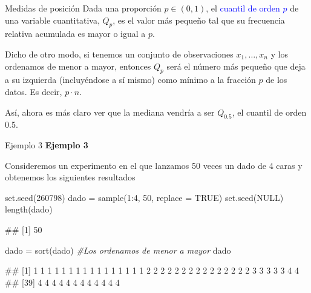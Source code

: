 \documentclass[
  ignorenonframetext,
  aspectratio=169]{beamer}
\newenvironment{Shaded}{\begin{snugshade}}{\end{snugshade}}
\newcommand{\AttributeTok}[1]{\textcolor[rgb]{0.77,0.63,0.00}{#1}}
\newcommand{\CommentTok}[1]{\textcolor[rgb]{0.56,0.35,0.01}{\textit{#1}}}
\newcommand{\ConstantTok}[1]{\textcolor[rgb]{0.00,0.00,0.00}{#1}}
\newcommand{\DecValTok}[1]{\textcolor[rgb]{0.00,0.00,0.81}{#1}}
\newcommand{\FunctionTok}[1]{\textcolor[rgb]{0.00,0.00,0.00}{#1}}
\newcommand{\NormalTok}[1]{#1}
\newcommand{\OtherTok}[1]{\textcolor[rgb]{0.56,0.35,0.01}{#1}}
\newcommand{\SpecialCharTok}[1]{\textcolor[rgb]{0.00,0.00,0.00}{#1}}
\let\oldverbatim\verbatim
\let\endoldverbatim\endverbatim
\renewenvironment{verbatim}{\tiny\oldverbatim}{\endoldverbatim}
\newcommand\blue[1]{\textcolor{blue}{#1}}
\begin{document}
\begin{frame}{Medidas de posición}
\protect\hypertarget{medidas-de-posiciuxf3n-2}{}
Dada una proporción \(p\in(0,1)\), el \blue{cuantil de orden $p$} de una
variable cuantitativa, \(Q_p\), es el valor más pequeño tal que su
frecuencia relativa acumulada es mayor o igual a \(p\).

Dicho de otro modo, si tenemos un conjunto de observaciones
\(x_1,\dots,x_n\) y los ordenamos de menor a mayor, entonces \(Q_p\)
será el número más pequeño que deja a su izquierda (incluyéndose a sí
mismo) como mínimo a la fracción \(p\) de los datos. Es decir,
\(p\cdot n\).

Así, ahora es más claro ver que la mediana vendría a ser \(Q_{0.5}\), el
cuantil de orden 0.5.
\end{frame}

\begin{frame}[fragile]{Ejemplo 3}
\protect\hypertarget{ejemplo-3-5}{}
\textbf{Ejemplo 3}

Consideremos un experimento en el que lanzamos 50 veces un dado de 4
caras y obtenemos los siguientes resultados

\begin{Shaded}
\begin{Highlighting}[]
\FunctionTok{set.seed}\NormalTok{(}\DecValTok{260798}\NormalTok{)}
\NormalTok{dado }\OtherTok{=} \FunctionTok{sample}\NormalTok{(}\DecValTok{1}\SpecialCharTok{:}\DecValTok{4}\NormalTok{, }\DecValTok{50}\NormalTok{, }\AttributeTok{replace =} \ConstantTok{TRUE}\NormalTok{)}
\FunctionTok{set.seed}\NormalTok{(}\ConstantTok{NULL}\NormalTok{)}
\FunctionTok{length}\NormalTok{(dado)}
\end{Highlighting}
\end{Shaded}

\begin{verbatim}
## [1] 50
\end{verbatim}

\begin{Shaded}
\begin{Highlighting}[]
\NormalTok{dado }\OtherTok{=} \FunctionTok{sort}\NormalTok{(dado) }\CommentTok{\#Los ordenamos de menor a mayor}
\NormalTok{dado}
\end{Highlighting}
\end{Shaded}

\begin{verbatim}
##  [1] 1 1 1 1 1 1 1 1 1 1 1 1 1 1 1 1 2 2 2 2 2 2 2 2 2 2 2 2 2 2 2 3 3 3 3 3 4 4
## [39] 4 4 4 4 4 4 4 4 4 4 4 4
\end{verbatim}
\end{frame}
\end{document}
